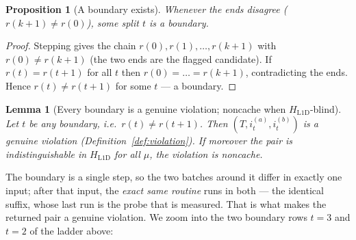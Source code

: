 \documentclass[11pt]{article}
\theoremstyle{definition}
\theoremstyle{plain}
\newtheorem{lemma}{Lemma}
\newtheorem{proposition}{Proposition}
\newcommand{\HL}{H_{\mathrm{L1D}}}
\newcommand{\inp}[2]{i_{#1}^{(#2)}}
\begin{document}
\begin{proposition}[A boundary exists]
\label{prop:boundary}
Whenever the ends disagree ($r(k+1)\neq r(0)$), some split $t$ is a boundary.
\end{proposition}

\begin{proof}
Stepping gives the chain $r(0),r(1),\dots,r(k+1)$ with $r(0)\neq r(k+1)$ (the two ends
are the flagged candidate). If $r(t)=r(t+1)$ for all $t$ then $r(0)=\dots=r(k+1)$,
contradicting the ends. Hence $r(t)\neq r(t+1)$ for some $t$ --- a boundary.
\end{proof}

\begin{lemma}[Every boundary is a genuine violation; noncache when $\HL$-blind]
\label{lem:genuine}
Let $t$ be any boundary, i.e.\ $r(t)\neq r(t+1)$. Then $(T,\inp{t}{a},\inp{t}{b})$ is a
genuine violation (Definition~\ref{def:violation}). If moreover the pair is
indistinguishable in $\HL$ for all $\mu$, the violation is noncache.
\end{lemma}

The boundary is a single step, so the two batches around it differ in exactly one input;
after that input, the \emph{exact same routine} runs in both --- the identical suffix,
whose last run is the probe that is measured. That is what makes the returned pair a
genuine violation. We zoom into the two boundary rows $t=3$ and $t=2$ of the ladder
above:
\end{document}
